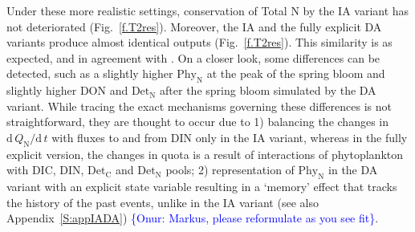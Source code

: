 \documentclass[gmd, manuscript]{copernicus}
\newcommand{\onur}[1]{\textcolor{blue}{\{Onur: #1\}}}
\begin{document}
% 

Under these more realistic settings, conservation of Total N by the IA variant has not deteriorated (Fig.~\ref{f.T2res}). Moreover, the IA and the fully explicit DA variants produce almost identical outputs (Fig.~\ref{f.T2res}).  This similarity is as expected, and in agreement with \citet{Ward2017}. On a closer look, some differences can be detected, such as a slightly higher $\text{Phy}_{\text{N}}$ at the peak of the spring bloom and slightly higher DON and $\text{Det}_{\text{N}}$ after the spring bloom simulated by the DA variant. While tracing the exact mechanisms governing these differences is not straightforward, they are thought to occur due to 1) balancing the changes in $\text{d}\,Q_{\text{N}}/\text{d}\,t$ with fluxes to and from DIN only in the IA variant, whereas in the fully explicit version, the changes in quota is a result of interactions of phytoplankton with DIC, DIN, $\text{Det}_{\text{C}}$ and $\text{Det}_{\text{N}}$ pools; 2) representation of $\text{Phy}_{\text{N}}$ in the DA variant with an explicit state variable resulting in a `memory' effect that tracks the history of the past events, unlike in the IA variant (see also Appendix~\ref{S:appIADA}) \onur{Markus, please reformulate as you see fit}.
\end{document}
